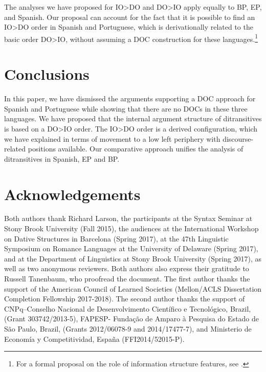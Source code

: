 \documentclass[output=paper,colorlinks,citecolor=brown,nonflat]{./langscibook}
\begin{document}
The analyses we have proposed for IO>DO and DO>IO apply equally to BP, EP, and Spanish. Our proposal can account for the fact that it is possible to find an IO>DO order in Spanish and Portuguese, which is derivationally related to the basic order DO>IO, without assuming a DOC construction for these languages.\footnote{For a formal proposal on the role of information structure features, see \citet{CépedaCyrino2017}.}

\section{Conclusions}\label{sec:cepeda:4}

In this paper, we have dismissed the arguments supporting a DOC approach for Spanish and Portuguese while showing that there are no DOCs in these three languages. We have proposed that the internal argument structure of ditransitives is based on a DO>IO order. The IO>DO order is a derived configuration, which we have explained in terms of movement to a low left periphery with discourse-related positions available. Our comparative approach unifies the analysis of ditransitives in Spanish, EP and BP.


\section*{Acknowledgements}
Both authors thank Richard Larson, the participants at the Syntax Seminar at Stony Brook University (Fall 2015), the audiences at the International Workshop on Dative Structures in Barcelona (Spring 2017), at the 47th Linguistic Symposium on Romance Languages at the University of Delaware (Spring 2017), and at the Department of Linguistics at Stony Brook University (Spring 2017), as well as two anonymous reviewers. Both authors also express their gratitude to Russell Tanenbaum, who proofread the document. The first author thanks the support of the American Council of Learned Societies (Mellon/ACLS Dissertation Completion Fellowship 2017-2018). The second author thanks the support of CNPq–Conselho Nacional de Desenvolvimento Científico e Tecnológico, Brazil, (Grant 303742/2013-5), FAPESP- Fundação de Amparo à Pesquisa do Estado de São Paulo, Brazil, (Grants 2012/06078-9 and 2014/17477-7), and Ministerio de Economía y Competitividad, España (FFI2014/52015-P).

\sloppy\printbibliography[heading=subbibliography,notkeyword=this]
\end{document}
